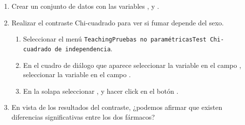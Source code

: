 \begin{enumerate}[leftmargin=*]
\begin{enumerate}
\item Crear un conjunto de datos con las variables , y .

\item Realizar el contraste Chi-cuadrado para ver si fumar depende del sexo.  
\begin{indicacion}{
\begin{enumerate}
\item Seleccionar el menú \texttt{Teaching\flecha Pruebas no paramétricas\flecha Test Chi-cuadrado de independencia}.
\item En el cuadro de diálogo que aparece seleccionar la variable  en el campo , seleccionar la variable  en el campo .
\item En la solapa  seleccionar , y hacer click en el
botón .
\end{enumerate}}
\end{indicacion}


\item En vista de los resultados del contraste, ¿podemos afirmar que existen diferencias significativas entre los dos
fármacos?
\end{enumerate}

\end{enumerate}


